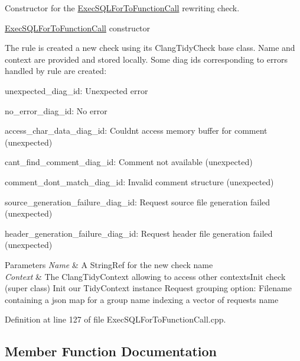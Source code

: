 Constructor for the \hyperlink{classclang_1_1tidy_1_1pagesjaunes_1_1_exec_s_q_l_for_to_function_call}{Exec\+S\+Q\+L\+For\+To\+Function\+Call} rewriting check. 

\hyperlink{classclang_1_1tidy_1_1pagesjaunes_1_1_exec_s_q_l_for_to_function_call}{Exec\+S\+Q\+L\+For\+To\+Function\+Call} constructor

The rule is created a new check using its {\ttfamily Clang\+Tidy\+Check} base class. Name and context are provided and stored locally. Some diag ids corresponding to errors handled by rule are created\+:
\begin{DoxyItemize}
\item unexpected\+\_\+diag\+\_\+id\+: Unexpected error
\item no\+\_\+error\+\_\+diag\+\_\+id\+: No error
\item access\+\_\+char\+\_\+data\+\_\+diag\+\_\+id\+: Couldn\textquotesingle{}t access memory buffer for comment (unexpected)
\item cant\+\_\+find\+\_\+comment\+\_\+diag\+\_\+id\+: Comment not available (unexpected)
\item comment\+\_\+dont\+\_\+match\+\_\+diag\+\_\+id\+: Invalid comment structure (unexpected)
\item source\+\_\+generation\+\_\+failure\+\_\+diag\+\_\+id\+: Request source file generation failed (unexpected)
\item header\+\_\+generation\+\_\+failure\+\_\+diag\+\_\+id\+: Request header file generation failed (unexpected)
\end{DoxyItemize}


\begin{DoxyParams}{Parameters}
{\em Name} & A String\+Ref for the new check name \\
\hline
{\em Context} & The Clang\+Tidy\+Context allowing to access other contexts\+Init check (super class) Init our Tidy\+Context instance Request grouping option\+: Filename containing a json map for a group name indexing a vector of requests name \\
\hline
\end{DoxyParams}


Definition at line 127 of file Exec\+S\+Q\+L\+For\+To\+Function\+Call.\+cpp.



\subsection{Member Function Documentation}
\mbox{\label{classclang_1_1tidy_1_1pagesjaunes_1_1_exec_s_q_l_for_to_function_call_abafbec75f2ed77ade5617ad6fa2c2a0d}} 
